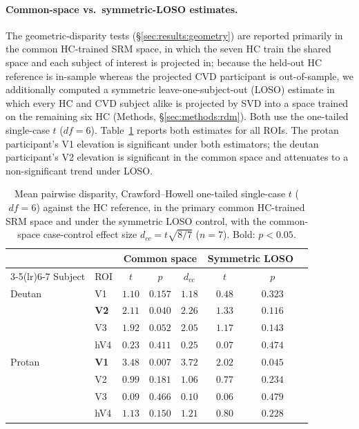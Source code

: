 \paragraph{Common-space vs.\ symmetric-LOSO estimates.}
The geometric-disparity tests (\S\ref{sec:results:geometry}) are reported primarily in the common HC-trained SRM space, in which the seven HC train the shared space and each subject of interest is projected in; because the held-out HC reference is in-sample whereas the projected CVD participant is out-of-sample, we additionally computed a symmetric leave-one-subject-out (LOSO) estimate in which every HC and CVD subject alike is projected by SVD into a space trained on the remaining six HC (Methods, \S\ref{sec:methods:rdm}). Both use the  one-tailed single-case $t$ ($df = 6$). Table~\ref{tab:disparity_loso} reports both estimates for all ROIs. The protan participant's V1 elevation is significant under both estimators; the deutan participant's V2 elevation is significant in the common space and attenuates to a non-significant trend under LOSO.

\begin{table}[h]
\centering
\caption{Mean pairwise disparity, Crawford--Howell one-tailed single-case $t$ ($df = 6$) against the HC reference, in the primary common HC-trained SRM space and under the symmetric LOSO control, with the common-space case-control effect size $d_{cc} = t\sqrt{8/7}$ ($n = 7$). Bold: $p < 0.05$.}
\label{tab:disparity_loso}
\begin{tabular}{llcccccc}
\toprule
 & & \multicolumn{3}{c}{Common space} & \multicolumn{2}{c}{Symmetric LOSO} \\
\cmidrule(lr){3-5}\cmidrule(lr){6-7}
Subject & ROI & $t$ & $p$ & $d_{cc}$ & $t$ & $p$ \\
\midrule
Deutan & V1 & $1.10$ & $0.157$ & $1.18$ & $0.48$ & $0.323$ \\
 & \textbf{V2} & $\mathbf{2.11}$ & $\mathbf{0.040}$ & $2.26$ & $1.33$ & $0.116$ \\
 & V3 & $1.92$ & $0.052$ & $2.05$ & $1.17$ & $0.143$ \\
 & hV4 & $0.23$ & $0.411$ & $0.25$ & $0.07$ & $0.474$ \\
\midrule
Protan & \textbf{V1} & $\mathbf{3.48}$ & $\mathbf{0.007}$ & $3.72$ & $\mathbf{2.02}$ & $\mathbf{0.045}$ \\
 & V2 & $0.99$ & $0.181$ & $1.06$ & $0.77$ & $0.234$ \\
 & V3 & $0.09$ & $0.466$ & $0.10$ & $0.06$ & $0.479$ \\
 & hV4 & $1.13$ & $0.150$ & $1.21$ & $0.80$ & $0.228$ \\
\bottomrule
\end{tabular}
\end{table}


